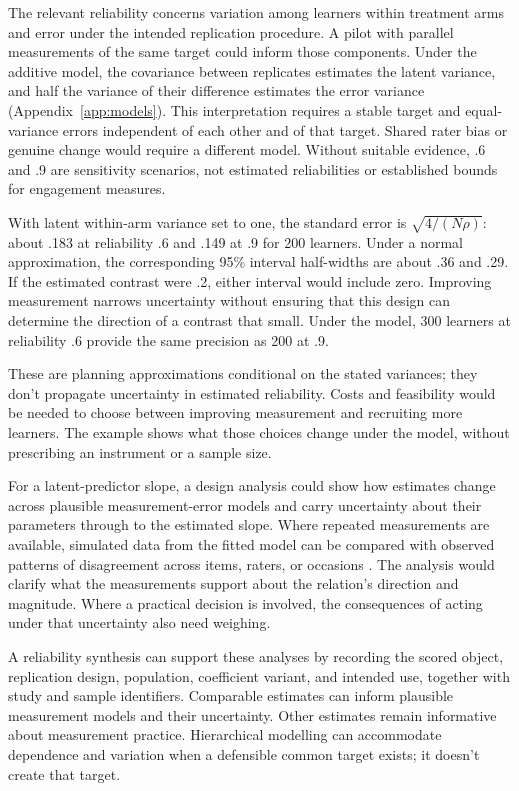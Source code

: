 \documentclass[12pt,twoside]{article}
\begin{document}
The relevant reliability concerns variation among learners within treatment arms and error under the intended replication procedure. A pilot with parallel measurements of the same target could inform those components. Under the additive model, the covariance between replicates estimates the latent variance, and half the variance of their difference estimates the error variance (Appendix~\ref{app:models}). This interpretation requires a stable target and equal-variance errors independent of each other and of that target. Shared rater bias or genuine change would require a different model. Without suitable evidence, .6 and .9 are sensitivity scenarios, not estimated reliabilities or established bounds for engagement measures.

With latent within-arm variance set to one, the standard error is $\sqrt{4/(N\rho)}$: about .183 at reliability .6 and .149 at .9 for 200 learners. Under a normal approximation, the corresponding 95\% interval half-widths are about .36 and .29. If the estimated contrast were .2, either interval would include zero. Improving measurement narrows uncertainty without ensuring that this design can determine the direction of a contrast that small. Under the model, 300 learners at reliability .6 provide the same precision as 200 at .9.

These are planning approximations conditional on the stated variances; they don't propagate uncertainty in estimated reliability. Costs and feasibility would be needed to choose between improving measurement and recruiting more learners. The example shows what those choices change under the model, without prescribing an instrument or a sample size.

For a latent-predictor slope, a design analysis could show how estimates change across plausible measurement-error models and carry uncertainty about their parameters through to the estimated slope. Where repeated measurements are available, simulated data from the fitted model can be compared with observed patterns of disagreement across items, raters, or occasions \citep[p.\ 30]{gelman2020bayesianworkflow}. The analysis would clarify what the measurements support about the relation's direction and magnitude. Where a practical decision is involved, the consequences of acting under that uncertainty also need weighing.

A reliability synthesis can support these analyses by recording the scored object, replication design, population, coefficient variant, and intended use, together with study and sample identifiers. Comparable estimates can inform plausible measurement models and their uncertainty. Other estimates remain informative about measurement practice. Hierarchical modelling can accommodate dependence and variation when a defensible common target exists; it doesn't create that target.
\end{document}
